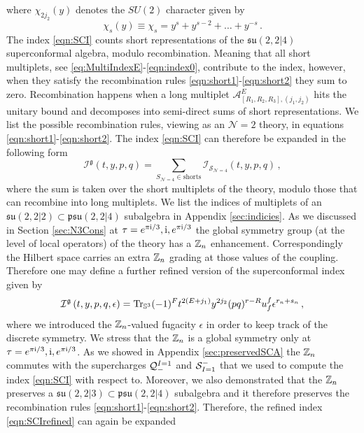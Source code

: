 \documentclass[main.tex]{subfiles}
\begin{document}
where $\chi_{2j_2}(y)$ denotes the $SU(2)$ character given by
\begin{equation}
\chi_s(y)\equiv\chi_s=y^{s}+y^{s-2}+\dots+y^{-s}\,.
\end{equation}
The index \eqref{eqn:SCI} counts short representations of the $\mathfrak{su}(2,2|4)$ superconformal algebra, modulo recombination.
Meaning that all short multiplets, see \eqref{eq:MultiIndexE}-\eqref{eqn:index0}, contribute to the index, however, when they satisfy the recombination rules \eqref{eqn:short1}-\eqref{eqn:short2} they sum to zero.
Recombination happens when a long multiplet $\mathcal{A}^E_{[R_1,R_2,R_3],(j_1,j_2)}$ hits the unitary bound and decomposes into semi-direct sums of short representations. We list the possible recombination rules, viewing as an $\mathcal{N}=2$ theory, in equations \eqref{eqn:short1}-\eqref{eqn:short2}. The index \eqref{eqn:SCI} can therefore be expanded in the following form
\begin{equation}
\mathcal{I}^{\mathfrak{g}}(t,y,p,q) =
\sum_{S_{\mathcal{N}=4} \in \text{shorts}} \mathcal{I}_{\mathcal{S}_{\mathcal{N}=4}}(t,y,p,q) \, ,
\end{equation}
where the sum is taken over the short multiplets of the theory, modulo those that can recombine into long multiplets.
We list the indices of multiplets of an $\mathfrak{su}(2,2|2)\subset \mathfrak{psu}(2,2|4)$ subalgebra in Appendix \ref{sec:indicies}. 
As we discussed in Section \ref{sec:N3Cons} at $\tau=e^{\pi\mathrm{i}/3},\mathrm{i},e^{\pi\mathrm{i}/3}$ the global symmetry group (at the level of local operators) of the theory has a $\mathbb{Z}_{n}$ enhancement. Correspondingly the Hilbert space carries an extra $\mathbb{Z}_{n}$ grading at those values of the coupling. Therefore one may define a further refined version of the superconformal index given by
\begin{equation}\label{eqn:SCIrefined}
 \mathcal{I}^{\mathfrak{g}}\left(t,y,p,q,\epsilon\right)
 =\textrm{Tr}_{\mathbb{S}^3}(-1)^Ft^{2(E+j_1)}y^{2j_2}(pq)^{r-R}u_f^f\epsilon^{r_{n}+ s_{n}}\, ,
\end{equation}
where we introduced the $\mathbb{Z}_{n}$-valued fugacity $\epsilon$ in order to keep track of the discrete symmetry. We stress that the $\mathbb{Z}_{n}$ is a global symmetry only at $\tau=e^{\pi\mathrm{i}/3},\mathrm{i},e^{\pi\mathrm{i}/3}$. As we showed in Appendix \ref{sec:preservedSCA} the $\mathbb{Z}_{n}$ commutes with the supercharges $\mathcal{Q}_{-}^{I=1}$ and $\mathcal{S}^{-}_{I=1}$ that we used to compute the index \eqref{eqn:SCI} with respect to. Moreover, we also demonstrated that the $\mathbb{Z}_{n}$ preserves a $\mathfrak{su}(2,2|3)\subset\mathfrak{psu}(2,2|4)$ subalgebra and it therefore preserves the recombination rules \eqref{eqn:short1}-\eqref{eqn:short2}. Therefore, the refined index \eqref{eqn:SCIrefined} can again be expanded
\end{document}
